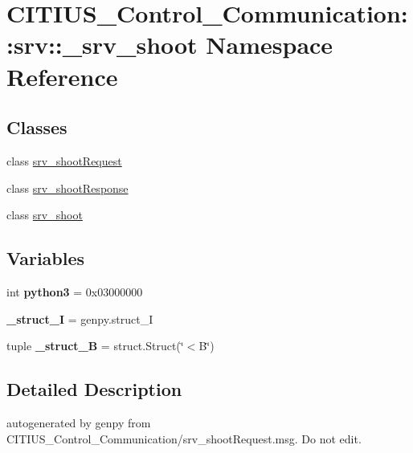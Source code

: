 \hypertarget{namespace_c_i_t_i_u_s___control___communication_1_1srv_1_1__srv__shoot}{\section{\-C\-I\-T\-I\-U\-S\-\_\-\-Control\-\_\-\-Communication\-:\-:srv\-:\-:\-\_\-srv\-\_\-shoot \-Namespace \-Reference}
\label{namespace_c_i_t_i_u_s___control___communication_1_1srv_1_1__srv__shoot}
}
\subsection*{\-Classes}
\begin{DoxyCompactItemize}
\item 
class \hyperlink{class_c_i_t_i_u_s___control___communication_1_1srv_1_1__srv__shoot_1_1srv__shoot_request}{srv\-\_\-shoot\-Request}
\item 
class \hyperlink{class_c_i_t_i_u_s___control___communication_1_1srv_1_1__srv__shoot_1_1srv__shoot_response}{srv\-\_\-shoot\-Response}
\item 
class \hyperlink{class_c_i_t_i_u_s___control___communication_1_1srv_1_1__srv__shoot_1_1srv__shoot}{srv\-\_\-shoot}
\end{DoxyCompactItemize}
\subsection*{\-Variables}
\begin{DoxyCompactItemize}
\item 
\hypertarget{namespace_c_i_t_i_u_s___control___communication_1_1srv_1_1__srv__shoot_a9e53d185107b94e2acf79a3ae53daab5}{int {\bfseries python3} = 0x03000000}\label{namespace_c_i_t_i_u_s___control___communication_1_1srv_1_1__srv__shoot_a9e53d185107b94e2acf79a3ae53daab5}

\item 
\hypertarget{namespace_c_i_t_i_u_s___control___communication_1_1srv_1_1__srv__shoot_aa24dbb22cd93363ddf155d42cf9c3d13}{{\bfseries \-\_\-struct\-\_\-\-I} = genpy.\-struct\-\_\-\-I}\label{namespace_c_i_t_i_u_s___control___communication_1_1srv_1_1__srv__shoot_aa24dbb22cd93363ddf155d42cf9c3d13}

\item 
\hypertarget{namespace_c_i_t_i_u_s___control___communication_1_1srv_1_1__srv__shoot_a2300dc1ce85976ff55bafe4050bf3bb0}{tuple {\bfseries \-\_\-struct\-\_\-\-B} = struct.\-Struct(\char`\"{}$<$\-B\char`\"{})}\label{namespace_c_i_t_i_u_s___control___communication_1_1srv_1_1__srv__shoot_a2300dc1ce85976ff55bafe4050bf3bb0}

\end{DoxyCompactItemize}


\subsection{\-Detailed \-Description}
\begin{DoxyVerb}autogenerated by genpy from CITIUS_Control_Communication/srv_shootRequest.msg. Do not edit.\end{DoxyVerb}
 